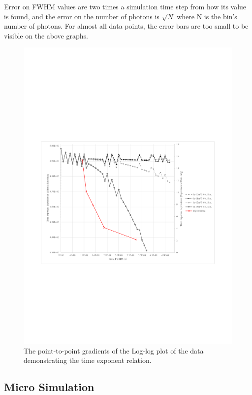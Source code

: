\documentclass[titlepage]{article}
\begin{document}
Error on FWHM values are two times a simulation time step from how its value is found, and the error on the number of photons is $\sqrt{N}$ where N is the bin's number of photons. For almost all data points, the error bars are too small to be visible on the above graphs.\\
\begin{figure}[H]
	\centering
	\includegraphics[scale=0.8]{Figures/CapExponents}
	\caption{The point-to-point gradients of the Log-log plot of the data demonstrating the time exponent relation.\label{res:Mac:Exponents}}
\end{figure}

\subsection{Micro Simulation}
\end{document}

